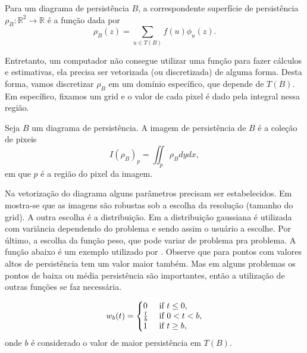 \begin{defi}
    Para um diagrama de persistência $B$, a correspondente superfície de persistência $\rho_B \colon \mathbb{R}^2
    \to \mathbb{R}$ é a função dada por 
    \begin{equation*}
        \rho_B(z) = \sum_{u \in T(B)} f(u) \phi_u(z). 
    \end{equation*}
\end{defi}

Entretanto, um computador não consegue utilizar uma função para fazer cálculos e estimativas, ela precisa
ser vetorizada (ou discretizada) de alguma forma. Desta forma, vamos discretizar $\rho_B$ em um domínio específico,
que depende de $T(B)$. Em específico, fixamos um grid e o valor de cada pixel é dado pela integral nessa região.

\begin{defi}
    Seja $B$ um diagrama de persistência. A imagem de persistência de $B$ é a coleção de pixeis 
    \begin{equation*}
        I(\rho_B)_p = \iint_p \rho_B dydx,
    \end{equation*}
    em que $p$ é a região do pixel da imagem.
\end{defi}

Na vetorização do diagrama alguns parâmetros precisam ser estabelecidos. Em \cite{Adams2017} mostra-se que
as imagens são robustas sob a escolha da resolução (tamanho do grid). A outra escolha é a distribuição. 
Em \cite{Adams2017} a distribuição gaussiana é utilizada com variância dependendo do problema e 
sendo assim o usuário a escolhe. Por último, a escolha da função peso, que pode variar de problema pra problema.
A função abaixo é um exemplo utilizado por \cite{Adams2017}. Observe que para pontos com valores altos de 
persistência tem um valor maior também. Mas em alguns problemas os pontos de baixa ou média persistência são importantes,
então a utilização de outras funções se faz necessária. 

\begin{equation}\label{eq:weightfunct}
    w_b(t) = \left\{
             \begin{array}{@{}ll@{}} 
                 0           & \text{ if } t \leq 0, \\
                 \frac{t}{b} & \text{ if } 0 < t < b, \\
                 1           & \text{ if } t \geq b, 
             \end{array}\right.
\end{equation}
onde $b$ é considerado o valor de maior persistência em $T(B)$.

